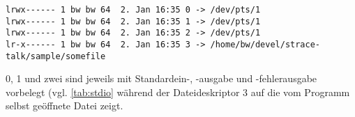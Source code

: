 \begin{lstlisting}
lrwx------ 1 bw bw 64  2. Jan 16:35 0 -> /dev/pts/1
lrwx------ 1 bw bw 64  2. Jan 16:35 1 -> /dev/pts/1
lrwx------ 1 bw bw 64  2. Jan 16:35 2 -> /dev/pts/1
lr-x------ 1 bw bw 64  2. Jan 16:35 3 -> /home/bw/devel/strace-talk/sample/somefile
\end{lstlisting}

0, 1 und zwei sind jeweils mit Standardein-, -ausgabe und -fehlerausgabe vorbelegt (vgl.
\autoref{tab:stdio} während der Dateideskriptor 3 auf die vom Programm selbst geöffnete Datei zeigt.


